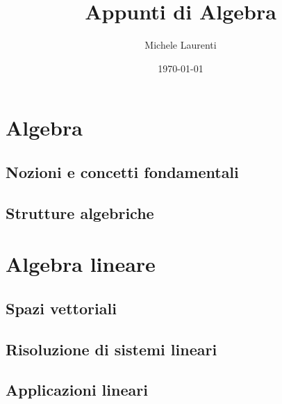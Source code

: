 \documentclass[11pt,a4paper,draft,twoside]{report}
\theoremstyle{plain}%
\theoremstyle{definition}
\theoremstyle{remark}
\begin{document}
\title{Appunti di Algebra}
\author{Michele Laurenti}
\date{\today}

\maketitle

\newpage

\tableofcontents
\newpage

\part{Algebra}

\chapter{Nozioni e concetti fondamentali}



\chapter{Strutture algebriche}



\part{Algebra lineare}

\chapter{Spazi vettoriali}



\chapter{Risoluzione di sistemi lineari}



\chapter{Applicazioni lineari}


\end{document}
